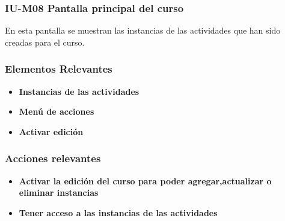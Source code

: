 \subsubsection{IU-M08 Pantalla principal del curso}

 En esta pantalla se muestran las instancias de las actividades que han sido creadas para el curso.


\subsubsection{Elementos Relevantes}

    \begin{itemize}
    \item {\bf Instancias de las actividades}
    \item {\bf Menú de acciones}
    \item {\bf Activar edición}
    \end{itemize}

\subsubsection{Acciones relevantes}

    \begin{itemize}
    \item {\bf Activar la edición del curso para poder agregar,actualizar o eliminar instancias}
    \item {\bf Tener acceso a las instancias de las actividades}
    \end{itemize}

\clearpage
